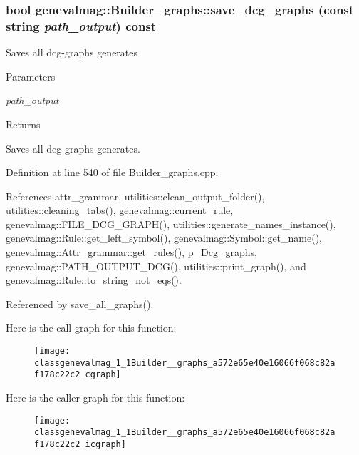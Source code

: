 \hypertarget{classgenevalmag_1_1Builder__graphs_a572e65e40e16066f068c82af178c22c2}{
\subsubsection[{save\_\-dcg\_\-graphs}]{\setlength{\rightskip}{0pt plus 5cm}bool genevalmag::Builder\_\-graphs::save\_\-dcg\_\-graphs (const string {\em path\_\-output}) const}}
\label{classgenevalmag_1_1Builder__graphs_a572e65e40e16066f068c82af178c22c2}
Saves all dcg-\/graphs generates 
\begin{DoxyParams}{Parameters}
\item[{\em path\_\-output}]\end{DoxyParams}
\begin{DoxyReturn}{Returns}

\end{DoxyReturn}
Saves all dcg-\/graphs generates. 

Definition at line 540 of file Builder\_\-graphs.cpp.



References attr\_\-grammar, utilities::clean\_\-output\_\-folder(), utilities::cleaning\_\-tabs(), genevalmag::current\_\-rule, genevalmag::FILE\_\-DCG\_\-GRAPH(), utilities::generate\_\-names\_\-instance(), genevalmag::Rule::get\_\-left\_\-symbol(), genevalmag::Symbol::get\_\-name(), genevalmag::Attr\_\-grammar::get\_\-rules(), p\_\-Dcg\_\-graphs, genevalmag::PATH\_\-OUTPUT\_\-DCG(), utilities::print\_\-graph(), and genevalmag::Rule::to\_\-string\_\-not\_\-eqs().



Referenced by save\_\-all\_\-graphs().



Here is the call graph for this function:\nopagebreak
\begin{figure}[H]
\begin{center}
\leavevmode
\texttt{[image: classgenevalmag\_1\_1Builder\_\_graphs\_a572e65e40e16066f068c82af178c22c2\_cgraph]}
\end{center}
\end{figure}




Here is the caller graph for this function:\nopagebreak
\begin{figure}[H]
\begin{center}
\leavevmode
\texttt{[image: classgenevalmag\_1\_1Builder\_\_graphs\_a572e65e40e16066f068c82af178c22c2\_icgraph]}
\end{center}
\end{figure}



